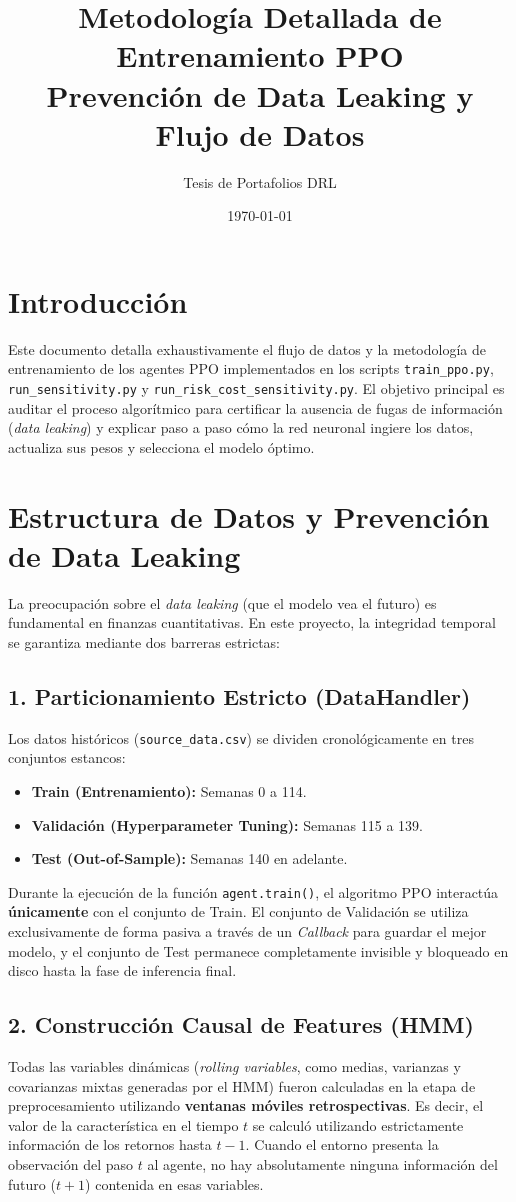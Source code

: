 \documentclass[12pt,a4paper]{article}
\title{Metodología Detallada de Entrenamiento PPO \\ \large Prevención de Data Leaking y Flujo de Datos}
\author{Tesis de Portafolios DRL}
\date{\today}
\begin{document}
\maketitle

\section{Introducción}
Este documento detalla exhaustivamente el flujo de datos y la metodología de entrenamiento de los agentes PPO implementados en los scripts \texttt{train\_ppo.py}, \texttt{run\_sensitivity.py} y \texttt{run\_risk\_cost\_sensitivity.py}. El objetivo principal es auditar el proceso algorítmico para certificar la ausencia de fugas de información (\textit{data leaking}) y explicar paso a paso cómo la red neuronal ingiere los datos, actualiza sus pesos y selecciona el modelo óptimo.

\section{Estructura de Datos y Prevención de Data Leaking}

La preocupación sobre el \textit{data leaking} (que el modelo vea el futuro) es fundamental en finanzas cuantitativas. En este proyecto, la integridad temporal se garantiza mediante dos barreras estrictas:

\subsection{1. Particionamiento Estricto (DataHandler)}
Los datos históricos (\texttt{source\_data.csv}) se dividen cronológicamente en tres conjuntos estancos:
\begin{itemize}
    \item \textbf{Train (Entrenamiento):} Semanas 0 a 114.
    \item \textbf{Validación (Hyperparameter Tuning):} Semanas 115 a 139.
    \item \textbf{Test (Out-of-Sample):} Semanas 140 en adelante.
\end{itemize}
Durante la ejecución de la función \texttt{agent.train()}, el algoritmo PPO interactúa \textbf{únicamente} con el conjunto de Train. El conjunto de Validación se utiliza exclusivamente de forma pasiva a través de un \textit{Callback} para guardar el mejor modelo, y el conjunto de Test permanece completamente invisible y bloqueado en disco hasta la fase de inferencia final.

\subsection{2. Construcción Causal de Features (HMM)}
Todas las variables dinámicas (\textit{rolling variables}, como medias, varianzas y covarianzas mixtas generadas por el HMM) fueron calculadas en la etapa de preprocesamiento utilizando \textbf{ventanas móviles retrospectivas}. Es decir, el valor de la característica en el tiempo $t$ se calculó utilizando estrictamente información de los retornos hasta $t-1$. Cuando el entorno presenta la observación del paso $t$ al agente, no hay absolutamente ninguna información del futuro ($t+1$) contenida en esas variables.
\end{document}
